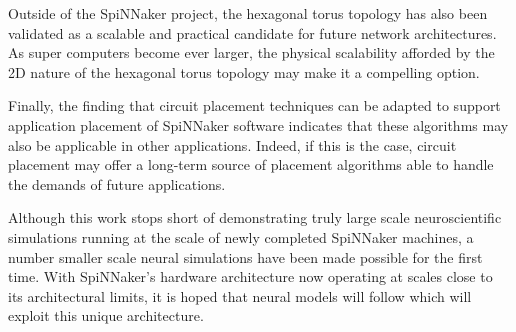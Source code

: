 		Outside of the SpiNNaker project, the hexagonal torus topology has also
		been validated as a scalable and practical candidate for future network
		architectures. As super computers become ever larger, the physical
		scalability afforded by the 2D nature of the hexagonal torus topology may
		make it a compelling option.
		
		Finally, the finding that circuit placement techniques can be adapted to
		support application placement of SpiNNaker software indicates that these
		algorithms may also be applicable in other applications. Indeed, if this is
		the case, circuit placement may offer a long-term source of placement
		algorithms able to handle the demands of future applications.
		
		
		Although this work stops short of demonstrating truly large scale
		neuroscientific simulations running at the scale of newly completed
		SpiNNaker machines, a number smaller scale neural simulations have been
		made possible for the first time. With SpiNNaker's hardware architecture
		now operating at scales close to its architectural limits, it is hoped that
		neural models will follow which will exploit this unique architecture.

